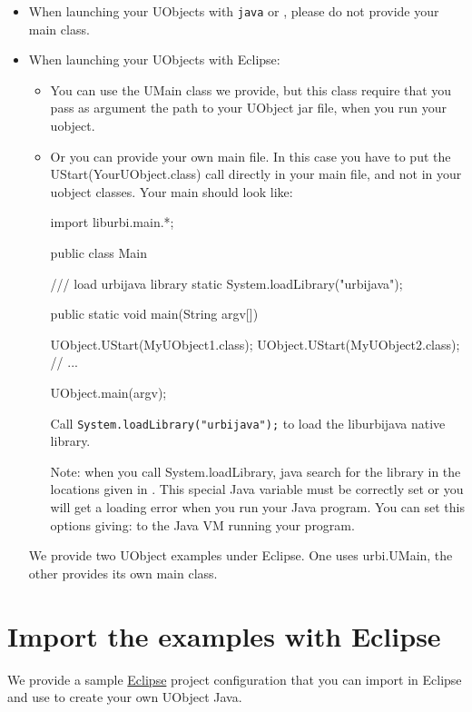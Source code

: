 \begin{itemize}
\item When launching your UObjects with \lstinline{java} or
  , please do not provide your main class.

\item When launching your UObjects with Eclipse:
  \begin{itemize}
  \item You can use the UMain class we provide, but this class require that
    you pass as argument the path to your UObject jar file, when you run
    your uobject.
  \item Or you can provide your own main file. In this case you have to put
    the UStart(YourUObject.class) call directly in your main file, and not
    in your uobject classes. Your main should look like:

\begin{java}
import liburbi.main.*;

public class Main
{
  /// load urbijava library
  static
  {
    System.loadLibrary("urbijava");
  }

  public static void main(String argv[])
  {
    UObject.UStart(MyUObject1.class);
    UObject.UStart(MyUObject2.class);
    // ...

    UObject.main(argv);
  }
}
\end{java}

Call \lstinline{System.loadLibrary("urbijava");} to load the liburbijava
native library.

Note: when you call System.loadLibrary, java search for the library in the
locations given in . This special Java variable must
be correctly set or you will get a loading error when you run your Java
program.  You can set this options giving:
 to the
Java VM running your program.
\end{itemize}

We provide two UObject examples under Eclipse. One uses urbi.UMain, the
other provides its own main class.
\end{itemize}


\section{Import the examples with Eclipse}

We provide a sample \href{http://www.eclipse.org/}{Eclipse} project
configuration that you can import in Eclipse and use to create your own
UObject Java.

